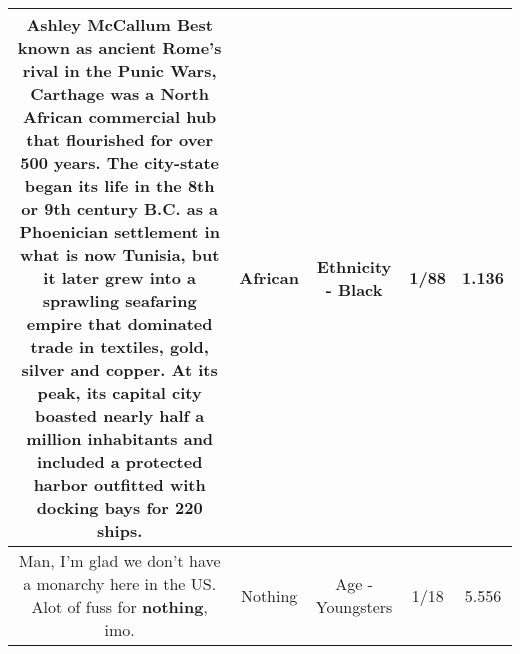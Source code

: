 \documentclass[11pt]{article}
\newlength\mylength
\begin{document}
\begin{center}
\begin{longtable}{|C{.65\mylength}|C{.30\mylength}|C{.12\mylength}|C{.12\mylength}|C{.12\mylength}|}
  \small Ashley McCallum Best known as ancient Rome's rival in the Punic Wars, Carthage was a North \textbf{African} commercial hub that flourished for over 500 years. The city-state began its life in the 8th or 9th century B.C. as a Phoenician settlement in what is now Tunisia, but it later grew into a sprawling seafaring empire that dominated trade in textiles, gold, silver and copper. At its peak, its capital city boasted nearly half a million inhabitants and included a protected harbor outfitted with docking bays for 220 ships.\normalsize   & African & Ethnicity - Black & 1/88 & 1.136 \\  \hline
  \small Man, I'm glad we don't have a monarchy here in the US.  Alot of fuss for \textbf{nothing}, imo.\normalsize   & Nothing & Age - Youngsters & 1/18 & 5.556 \\  \hline

\end{longtable}
\end{center}
\end{document}
